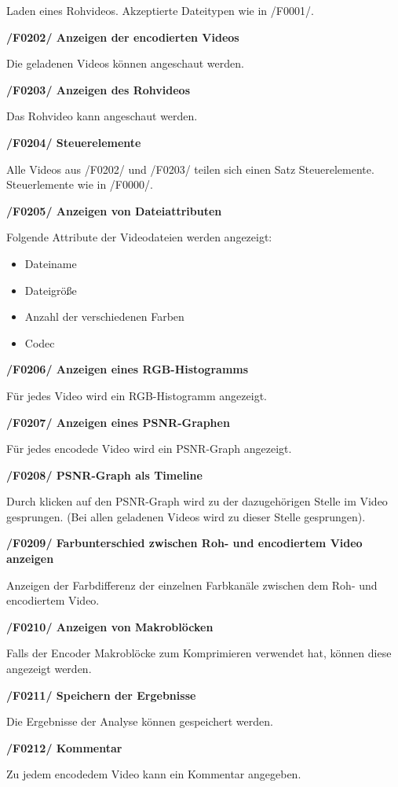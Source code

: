 \documentclass[parskip=full]{scrartcl}
\begin{document}
Laden eines Rohvideos. Akzeptierte Dateitypen wie in /F0001/.

\textbf{/F0202/ Anzeigen der encodierten Videos}

Die geladenen Videos können angeschaut werden.

\textbf{/F0203/ Anzeigen des Rohvideos}

Das Rohvideo kann angeschaut werden.

\textbf{/F0204/ Steuerelemente}

Alle Videos aus /F0202/ und /F0203/ teilen sich einen Satz Steuerelemente. Steuerlemente wie in /F0000/.

\textbf{/F0205/ Anzeigen von Dateiattributen}

Folgende Attribute der Videodateien werden angezeigt:
\begin{itemize}
\item Dateiname
\item Dateigröße
\item Anzahl der verschiedenen Farben
\item Codec
\end{itemize}

\textbf{/F0206/ Anzeigen eines RGB-Histogramms}

Für jedes Video wird ein RGB-Histogramm angezeigt.

\textbf{/F0207/ Anzeigen eines PSNR-Graphen}

Für jedes encodede Video wird ein PSNR-Graph angezeigt.

\textbf{/F0208/ PSNR-Graph als Timeline}

Durch klicken auf den PSNR-Graph wird zu der dazugehörigen Stelle im Video gesprungen. (Bei allen geladenen Videos wird zu dieser Stelle gesprungen).

\textbf{/F0209/ Farbunterschied zwischen Roh- und encodiertem Video anzeigen}

Anzeigen der Farbdifferenz der einzelnen Farbkanäle zwischen dem Roh- und encodiertem Video.

\textbf{/F0210/ Anzeigen von Makroblöcken}

Falls der Encoder Makroblöcke zum Komprimieren verwendet hat, können diese angezeigt werden.

\textbf{/F0211/ Speichern der Ergebnisse}

Die Ergebnisse der Analyse können gespeichert werden.

\textbf{/F0212/ Kommentar}

Zu jedem encodedem Video kann ein Kommentar angegeben.
\end{document}
